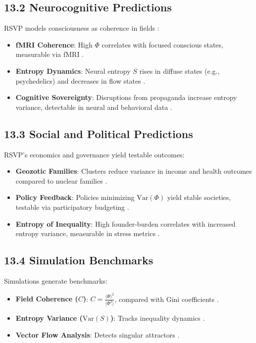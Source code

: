 \documentclass[12pt]{article}
\begin{document}
\subsection*{13.2 Neurocognitive Predictions}
RSVP models consciousness as coherence in fields \citep{tononi2004}:
\begin{itemize}
    \item \textbf{fMRI Coherence}: High \(\Phi\) correlates with focused conscious states, measurable via fMRI \citep{hohwy2013}.
    \item \textbf{Entropy Dynamics}: Neural entropy \(S\) rises in diffuse states (e.g., psychedelics) and decreases in flow states \citep{shannon1948}.
    \item \textbf{Cognitive Sovereignty}: Disruptions from propaganda increase entropy variance, detectable in neural and behavioral data \citep{lanier2018}.
\end{itemize}

\subsection*{13.3 Social and Political Predictions}
RSVP's economics and governance yield testable outcomes:
\begin{itemize}
    \item \textbf{Geozotic Families}: Clusters reduce variance in income and health outcomes compared to nuclear families \citep{deleuze1987}.
    \item \textbf{Policy Feedback}: Policies minimizing \(\mathrm{Var}(\Phi)\) yield stable societies, testable via participatory budgeting \citep{hanson2003}.
    \item \textbf{Entropy of Inequality}: High founder-burden correlates with increased entropy variance, measurable in stress metrics \citep{zuboff2019}.
\end{itemize}

\subsection*{13.4 Simulation Benchmarks}
Simulations generate benchmarks:
\begin{itemize}
    \item \textbf{Field Coherence (\(C\))}: \(C = \frac{\langle \Phi \rangle^2}{\langle \Phi^2 \rangle}\), compared with Gini coefficients \citep{gromov1999}.
    \item \textbf{Entropy Variance (\(\mathrm{Var}(S)\))}: Tracks inequality dynamics \citep{shannon1948}.
    \item \textbf{Vector Flow Analysis}: Detects singular attractors \citep{pearl2009}.
\end{itemize}
\end{document}
